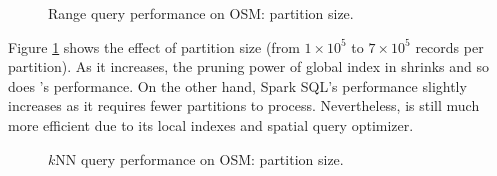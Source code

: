 \begin{appendix}
\begin{figure}[!h]
	\centering
	\caption{Range query performance on OSM: partition size.}
	\label{fig:rangepartition}\vspace{-1mm}
\end{figure}

Figure \ref{fig:rangepartition} shows the effect of partition size
(from $1 \times 10^5$ to $7 \times 10^5$ records per partition). As it
increases, the pruning power of global index in \name shrinks and so
does \name's performance. On the other hand, Spark SQL's performance
slightly increases as it requires fewer partitions to
process. Nevertheless, \name is still much more efficient due to its
local indexes and spatial query optimizer.

\begin{figure}[!h]
	\centering
	\vspace{0mm}
	\caption{$k$NN query performance on OSM: partition size.}\vspace{-1mm}
	\label{fig:knnparition}
\end{figure}


\end{appendix}
